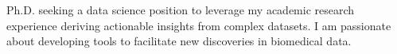 \small{
Ph.D. seeking a data science position to leverage my academic research experience deriving actionable insights from complex datasets. I am passionate about developing tools to facilitate new discoveries in biomedical data.
}